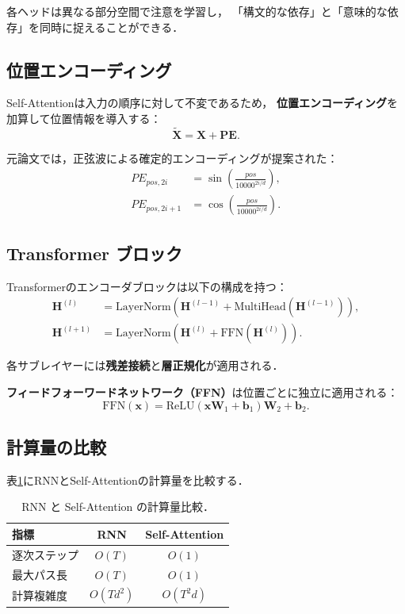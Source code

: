 各ヘッドは異なる部分空間で注意を学習し，
「構文的な依存」と「意味的な依存」を同時に捉えることができる．

\subsection{位置エンコーディング}

Self-Attentionは入力の順序に対して不変であるため，
\textbf{位置エンコーディング}を加算して位置情報を導入する：
\begin{equation}
  \tilde{\mathbf{X}} = \mathbf{X} + \mathbf{PE}.
\end{equation}

元論文では，正弦波による確定的エンコーディングが提案された：
\begin{align}
  PE_{pos, 2i} &= \sin\left(\frac{pos}{10000^{2i/d}}\right), \\
  PE_{pos, 2i+1} &= \cos\left(\frac{pos}{10000^{2i/d}}\right).
\end{align}

\subsection{Transformer ブロック}

Transformerのエンコーダブロックは以下の構成を持つ：
\begin{align}
  \mathbf{H}^{(l)} &= \mathrm{LayerNorm}(\mathbf{H}^{(l-1)} + \mathrm{MultiHead}(\mathbf{H}^{(l-1)})), \\
  \mathbf{H}^{(l+1)} &= \mathrm{LayerNorm}(\mathbf{H}^{(l)} + \mathrm{FFN}(\mathbf{H}^{(l)})).
\end{align}

各サブレイヤーには\textbf{残差接続}と\textbf{層正規化}が適用される．

\textbf{フィードフォーワードネットワーク（FFN）}は位置ごとに独立に適用される：
\begin{equation}
  \mathrm{FFN}(\mathbf{x}) = \mathrm{ReLU}(\mathbf{x}\mathbf{W}_1 + \boldsymbol{b}_1)\mathbf{W}_2 + \boldsymbol{b}_2.
\end{equation}

\subsection{計算量の比較}

表\ref{tab:complexity}にRNNとSelf-Attentionの計算量を比較する．

\begin{table}[hbtp]
  \centering
  \caption{RNN と Self-Attention の計算量比較．}
  \label{tab:complexity}
  \begin{tabular}{lcc}
    \toprule
    指標 & RNN & Self-Attention \\
    \midrule
    逐次ステップ & $O(T)$ & $O(1)$ \\
    最大パス長 & $O(T)$ & $O(1)$ \\
    計算複雑度 & $O(T d^2)$ & $O(T^2 d)$ \\
    \bottomrule
  \end{tabular}
\end{table}

